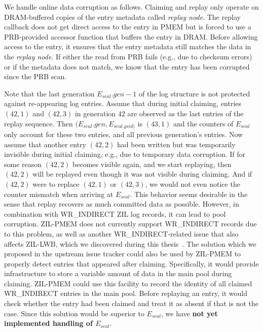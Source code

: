 \documentclass[12pt,a4paper,twoside]{book}
\begin{document}
{We handle online data corruption as follows.
Claiming and replay only operate on DRAM-buffered copies of the entry metadata called \textit{replay node}.
The replay callback does not get direct access to the entry in PMEM but is forced to use a PRB-provided accessor function that buffers the entry in DRAM.
Before allowing access to the entry, it ensures that the entry metadata still matches the data in the \textit{replay node}.
If either the read from PRB fails (e.g., due to checksum errors) or if the metadata does not match, we know that the entry has been corrupted since the PRB scan.

Note that the last generation $E_{seal}.gen - 1$ of the log structure is not protected against re-appearing log entries.
Assume that during initial claiming, entries $(42,1)$ and $(42,3)$ in generation $42$ are observed as the last entries of the replay sequence.
Then $(E_{seal}.gen, E_{seal.gsid)}$ is $(43,1)$ and the counters of $E_{seal}$ only account for these two entries, and all previous generation's entries.
Now assume that another entry $(42,2)$ had been written but was temporarily invisible during initial claiming, e.g., due to temporary data corruption.
If for some reason $(42,2)$ becomes visible again, and we start replaying, then $(42,2)$ will be replayed even though it was not visible during claiming.
And if $(42,2)$ were to replace $(42,1)$ or $(42,3)$, we would not even notice the counter mismatch when arriving at $E_{seal}$.
This behavior seems desirable in the sense that replay recovers as much committed data as possible.
However, in combination with WR\_INDIRECT ZIL log records, it can lead to pool corruption.
ZIL-PMEM does not currently support WR\_INDIRECT records due to this problem, as well as another WR\_INDIRECT-related issue that also affects ZIL-LWB, which we discovered during this thesis~\cite{OpenZFSGithubIssueZilLeaksClaimedBlocksInSeveralEdgeCases}.
The solution which we proposed in the upstream issue tracker could also be used by ZIL-PMEM to properly detect entries that appeared after claiming.
Specifically, it would provide infrastructure to store a variable amount of data in the main pool during claiming.
ZIL-PMEM could use this facility to record the identity of all claimed WR\_INDIRECT entries in the main pool.
Before replaying an entry, it would check whether the entry had been claimed and treat it as absent if that is not the case.
Since this solution would be superior to $E_{seal}$, we have \textbf{not yet implemented handling of $E_{seal}$}.

}
\end{document}
